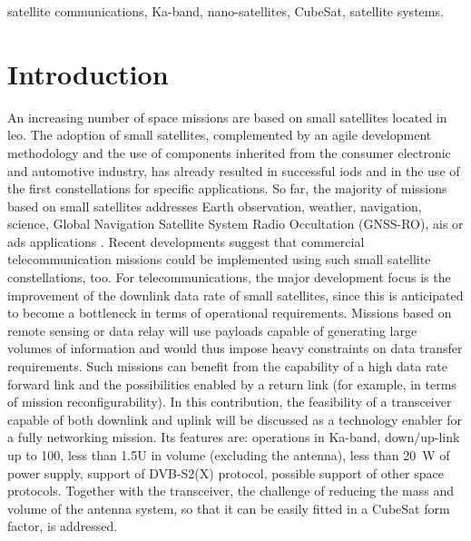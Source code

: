 \documentclass[conference,10pt,a4paper]{IEEEtran}%
\begin{document}
%
%
\begin{abstract}
This paper describes the feasibility study of a Ka-band transceiver specifically designed for small satellite and CubeSat operations.
The transponder is conceived to ensure up to \SI[detect-weight]{100}{\Mbps} of data rate with a target power consumption of \SI[detect-weight]{20}{\W} and an overall volume of 1.5U, not including the antenna.
To keep the cost as low as possible, commercial, off-the-shelf electronic components are used whenever possible.
Exploiting a data communication interface like the one proposed, the small satellites market could be opened to new applications such as remote sensing, Earth observation and commercial telecommunications.
\end{abstract}

\begin{IEEEkeywords}
satellite communications, Ka-band, nano-satellites, CubeSat, satellite systems.
\end{IEEEkeywords}

\section{Introduction}
An increasing number of space missions are based on small satellites located in \ac{leo}.
The adoption of small satellites, complemented by an agile development methodology and the use of components inherited from the consumer electronic and automotive industry, has already resulted in successful \glspl{iod} and in the use of the first constellations for specific applications.
So far, the majority of missions based on small satellites addresses Earth observation, weather, navigation, science, Global Navigation Satellite System Radio Occultation (GNSS-RO), \ac{ais} or \ac{ads} applications \cite{Gregorio2016}.
Recent developments suggest that commercial telecommunication missions could be implemented using such small satellite constellations, too.
For telecommunications, the major development focus is the improvement of the downlink data rate of small satellites, since this is anticipated to become a bottleneck in terms of operational requirements.
Missions based on remote sensing or data relay will use payloads capable of generating large volumes of information and would thus impose heavy constraints on data transfer requirements.
Such missions can benefit from the capability of a high data rate forward link and the possibilities enabled by a return link (for example, in terms of mission reconfigurability).
In this contribution, the feasibility of a transceiver capable of both downlink and uplink will be discussed as a technology enabler for a fully networking mission.
Its features are: operations in Ka-band, down/up-link up to \SI{100}{\Mbps}, less than 1.5U in volume (excluding the antenna), less than \SI{20}{\W} of power supply, support of DVB-S2(X) protocol, possible support of other space protocols.
Together with the transceiver, the challenge of reducing the mass and volume of the antenna system, so that it can be easily fitted in a CubeSat form factor, is addressed.
\end{document}
